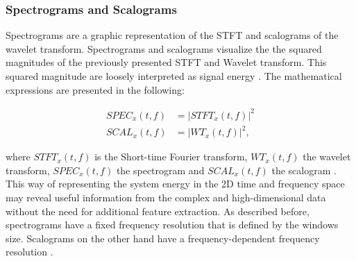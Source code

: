 \subsubsection{Spectrograms and Scalograms}

 Spectrograms are a graphic representation of the STFT and scalograms of the wavelet transform. Spectrograms and scalograms visualize the the squared magnitudes of the previously presented STFT and Wavelet transform. This squared magnitude are loosely interpreted as signal energy \cite{Hlawatsch1992}. The mathematical expressions are presented in the following: 

\begin{equation}
    \begin{aligned}
        SPEC_{x}(t,f) &= |STFT_{x}(t,f)|^{2} \\
        SCAL_{x}(t,f) &= |WT_{x}(t,f)|^{2}, 
    \end{aligned}
\end{equation}

where $STFT_{x}(t,f)$ is the Short-time Fourier transform, $WT_{x}(t,f)$ the wavelet transform, $SPEC_{x}(t,f)$ the spectrogram and $SCAL_{x}(t,f)$ the scalogram \cite{Hlawatsch1992}. This way of representing the system energy in the 2D time and frequency space may reveal useful information from the complex and high-dimensional data without the need for additional feature extraction. As described before, spectrograms have a fixed frequency resolution that is defined by the windows size. Scalograms on the other hand have a frequency-dependent frequency resolution \cite{Verstraete2017}.


